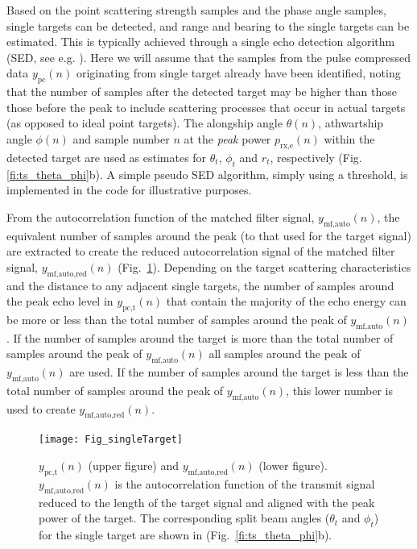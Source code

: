 \documentclass[preprint,12pt,TurnOnLineNumbers]{JASAnew}
\newcommand{\samplesymt}{n}
\newcommand{\prxe}{p_{\textrm{rx,e}}}
\newcommand{\ypc}{y_{\textrm{pc}}}
\newcommand{\ypctarget}{y_{\textrm{pc,t}}}
\newcommand{\ymfauto}{y_{\textrm{mf,auto}}}
\newcommand{\ymfautored}{y_{\textrm{mf,auto,red}}}
\newcommand{\athw}{\phi}
\newcommand{\along}{\theta}
\begin{document}
Based on the point scattering strength samples and the phase angle samples, single targets can be detected, and range and bearing to the single targets can be estimated. This is typically achieved through a single echo detection algorithm (SED, see e.g. \citet{OnaCRRTS}). Here we will assume that the samples from the pulse compressed data $\ypc(\samplesymt)$ originating from single target already have been identified, noting that the number of samples after the detected target may be higher than those those before the peak to include scattering processes that occur in actual targets (as opposed to ideal point targets). The alongship angle $\along(\samplesymt)$, athwartship angle $\athw(\samplesymt)$ and sample number $n$ at the \emph{peak} power $\prxe(\samplesymt)$ within the detected target are used as estimates for $\along_t$, $\athw_t$ and $r_t$, respectively (Fig. \ref{fi:ts_theta_phi}b). A simple pseudo SED algorithm, simply using a threshold, is implemented in the code for illustrative purposes.

From the autocorrelation function of the matched filter signal, $\ymfauto(\samplesymt)$, the equivalent number of samples around the peak (to that used for the target signal) are extracted to create the reduced autocorrelation signal of the matched filter signal, $\ymfautored(\samplesymt)$ (Fig.~\ref{fi:SED}). Depending on the target scattering characteristics and the distance to any adjacent single targets, the number of samples around the peak echo level in $\ypctarget(\samplesymt)$ that contain the majority of the echo energy can be more or less than the total number of samples around the peak of $\ymfauto(\samplesymt)$. If the number of samples around the target is more than the total number of samples around the peak of $\ymfauto(\samplesymt)$ all samples around the peak of $\ymfauto(\samplesymt)$ are used. If the number of samples around the target is less than the total number of samples around the peak of $\ymfauto(\samplesymt)$, this lower number is used to create $\ymfautored(\samplesymt)$.
%
\begin{figure}
\texttt{[image: Fig\_singleTarget]}
\caption{\label{fi:SED} $\ypctarget(\samplesymt)$ (upper figure) and $\ymfautored(\samplesymt)$ (lower figure). $\ymfautored(\samplesymt)$ is the autocorrelation function of the transmit signal reduced to the length of the target signal and aligned with the peak power of the target. The corresponding split beam angles ($\along_t$ and $\athw_t$) for the single target are shown in (Fig.~\ref{fi:ts_theta_phi}b).}
\end{figure}
\end{document}
